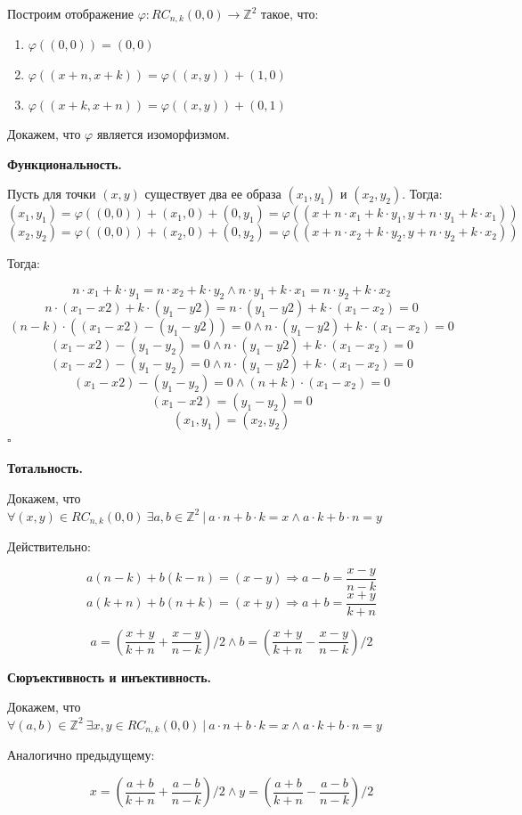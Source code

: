 Построим отображение $\varphi: RC_{n,k}(0,0) \longrightarrow \mathbb{Z}^2$ такое, что:

\begin{enumerate}
    \item $\varphi((0,0)) = (0,0)$
    \item $\varphi((x + n, x + k)) = \varphi((x,y)) + (1, 0)$
    \item $\varphi((x + k, x + n)) = \varphi((x,y)) + (0, 1)$
\end{enumerate}

Докажем, что $\varphi$ является изоморфизмом.

\textbf{Функциональность.}

Пусть для точки $(x,y)$ существует два ее образа $(x_1,y_1)$ и $(x_2,y_2)$. Тогда:
$$(x_1, y_1) = \varphi((0,0)) + (x_1, 0) + (0, y_1) = \varphi((x + n \cdot x_1 + k \cdot y_1, y + n \cdot y_1 + k \cdot x_1))$$
$$(x_2, y_2) = \varphi((0,0)) + (x_2, 0) + (0, y_2) = \varphi((x + n \cdot x_2 + k \cdot y_2, y + n \cdot y_2 + k \cdot x_2))$$

Тогда:

$$n \cdot x_1 + k \cdot y_1 = n \cdot x_2 + k \cdot y_2 \wedge n \cdot y_1 + k \cdot x_1 = n \cdot y_2 + k \cdot x_2$$
$$n \cdot (x_1 - x2) + k \cdot (y_1 - y2) = n \cdot (y_1 - y2) + k \cdot (x_1 - x_2) = 0$$
$$(n - k) \cdot ((x_1 - x2) - (y_1 - y2)) = 0 \wedge n \cdot (y_1 - y2) + k \cdot (x_1 - x_2) = 0$$
$$(x_1 - x2) - (y_1 - y_2) = 0 \wedge n \cdot (y_1 - y2) + k \cdot (x_1 - x_2) = 0$$
$$(x_1 - x2) - (y_1 - y_2) = 0 \wedge n \cdot (y_1 - y2) + k \cdot (x_1 - x_2) = 0$$
$$(x_1 - x2) - (y_1 - y_2) = 0 \wedge (n + k) \cdot (x_1 - x_2) = 0$$
$$(x_1 - x2) = (y_1 - y_2) = 0$$
$$(x_1, y_1) = (x_2, y_2)$$ \hfill $\square$

\textbf{Тотальность.}

Докажем, что $\forall (x, y) \in RC_{n,k}(0,0)\ \exists a, b \in \mathbb{Z}^2\ |\ a \cdot n + b \cdot k = x \wedge a \cdot k + b \cdot n = y$

Действительно:

$$a(n-k) + b(k-n) = (x-y) \Rightarrow a - b = \frac{x-y}{n-k}$$
$$a(k+n) + b(n+k) = (x+y) \Rightarrow a + b = \frac{x+y}{k+n}$$

$$a = \left(\frac{x+y}{k+n} + \frac{x-y}{n-k}\right)/2 \wedge b = \left(\frac{x+y}{k+n} - \frac{x-y}{n-k}\right)/2$$

\textbf{Сюръективность и инъективность.}

Докажем, что $\forall (a, b) \in \mathbb{Z}^2\ \exists x, y \in RC_{n,k}(0,0)\ |\ a \cdot n + b \cdot k = x \wedge a \cdot k + b \cdot n = y$

Аналогично предыдущему:

$$x = \left(\frac{a+b}{k+n} + \frac{a-b}{n-k}\right)/2 \wedge y = \left(\frac{a+b}{k+n} - \frac{a-b}{n-k}\right)/2$$
